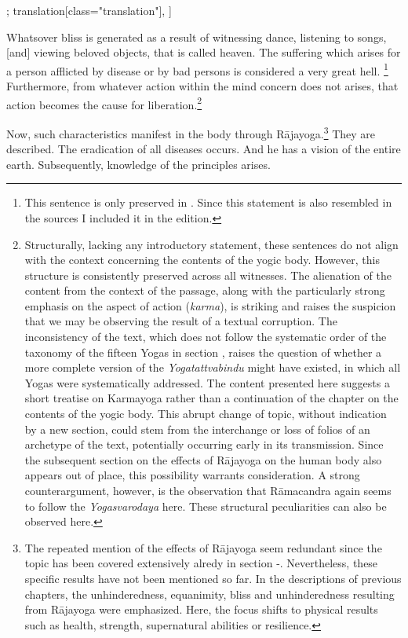 \begin{alignment}[
  texts=edition[class="edition"];
  translation[class="translation"],
  ]
\begin{translation}
\begin{tlate}[p41_03]
Whatsover bliss is generated as a result of witnessing dance, listening to songs, [and] viewing beloved objects, that is called heaven. The suffering which arises for a person afflicted by disease or by bad persons is considered a very great hell. \footnote{This sentence is only preserved in . Since this statement is also resembled in the sources I included it in the edition.} Furthermore, from whatever action within the mind concern does not arises, that action becomes the cause for liberation.\footnote{Structurally, lacking any introductory statement, these sentences do not align with the context concerning the contents of the yogic body. However, this structure is consistently preserved across all witnesses. The alienation of the content from the context of the passage, along with the particularly strong emphasis on the aspect of action (\textit{karma}), is striking and raises the suspicion that we may be observing the result of a textual corruption. The inconsistency of the text, which does not follow the systematic order of the taxonomy of the fifteen Yogas in section , raises the question of whether a more complete version of the \textit{Yogatattvabindu} might have existed, in which all Yogas were systematically addressed. The content presented here suggests a short treatise on Karmayoga rather than a continuation of the chapter on the contents of the yogic body. This abrupt change of topic, without indication by a new section, could stem from the interchange or loss of folios of an archetype of the text, potentially occurring early in its transmission. Since the subsequent section on the effects of Rājayoga on the human body also appears out of place, this possibility warrants consideration. A strong counterargument, however, is the observation that Rāmacandra again seems to follow the \textit{Yogasvarodaya} here. These structural peculiarities can also be observed here.}
\end{tlate}
\label{attributesrajabody}
\begin{tlate}[p42_01]
  \indent
Now, such characteristics manifest in the body through Rājayoga.\footnote{The repeated mention of the effects of Rājayoga seem redundant since the topic has been covered extensively alredy in section -. Nevertheless, these specific results have not been mentioned so far. In the descriptions of previous chapters, the unhinderedness, equanimity, bliss and unhinderedness resulting from Rājayoga were emphasized. Here, the focus shifts to physical results such as health, strength, supernatural abilities or resilience.} They are described. The eradication of all diseases occurs. And he has a vision of the entire earth. Subsequently, knowledge of the principles arises. 

\end{tlate}
\end{translation}
\end{alignment}

